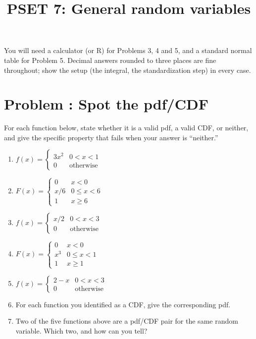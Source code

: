 \documentclass[11pt]{article}
\title{PSET 7: General random variables}
\author{}
\date{\vspace{-2.5em}}
\newcounter{problem}
\newcommand{\problem}[1]{\stepcounter{problem}\section*{Problem \theproblem: #1}}
\begin{document}
\maketitle



\noindent You will need a calculator (or R) for Problems 3, 4 and 5,
and a standard normal table for Problem 5. Decimal answers rounded to
three places are fine throughout; show the setup (the integral, the
standardization step) in every case.

\problem{Spot the pdf/CDF}

For each function below, state whether it is a valid pdf, a valid CDF,
or neither, and give the specific property that fails when your answer
is ``neither.''

\begin{enumerate}[label=\alph*.]
\item $f(x) = \begin{cases}
  3x^2 & 0 < x < 1 \\
  0 & \text{otherwise}
  \end{cases}$

\item $F(x) = \begin{cases}
  0 & x < 0 \\
  x/6 & 0 \leq x < 6 \\
  1 & x \geq 6
  \end{cases}$

\item $f(x) = \begin{cases}
  x/2 & 0 < x < 3 \\
  0 & \text{otherwise}
  \end{cases}$

\item $F(x) = \begin{cases}
  0 & x < 0 \\
  x^3 & 0 \leq x < 1 \\
  1 & x \geq 1
  \end{cases}$

\item $f(x) = \begin{cases}
  2 - x & 0 < x < 3 \\
  0 & \text{otherwise}
  \end{cases}$

\item For each function you identified as a CDF, give the
  corresponding pdf.

\item Two of the five functions above are a pdf/CDF pair for the same
  random variable. Which two, and how can you tell?
\end{enumerate}
\end{document}
